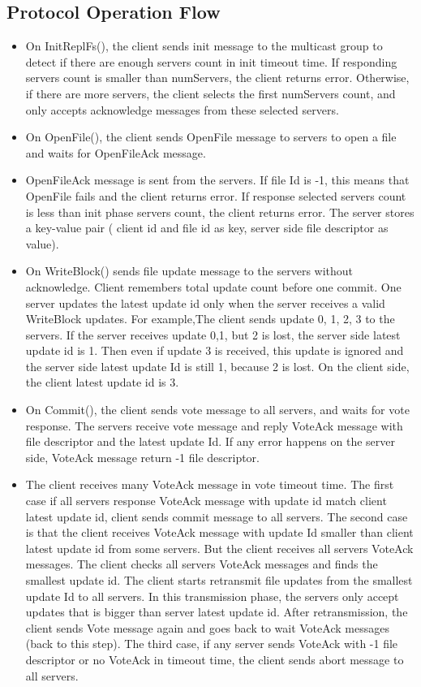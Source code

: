 \documentclass[12pt,fleqn]{article}
\begin{document}
\subsection{Protocol Operation Flow}
\begin{itemize}
	\item On InitReplFs(), the client sends init message to the multicast group to detect if there are enough servers count in init timeout time. If responding servers count is smaller than numServers, the client returns error. Otherwise, if there are more servers, the client selects the first numServers count, and only accepts acknowledge messages from these selected servers.
	\item On OpenFile(), the client sends OpenFile message to servers to open a file and waits for OpenFileAck message.
	\item OpenFileAck message is sent from the servers. If file Id is -1, this means that OpenFile fails and the client returns error. If response selected servers count is less than init phase servers count, the client returns error. The server stores a key-value pair ( client id and file id as key, server side file descriptor as value).
	\item On WriteBlock() sends file update message to the servers without acknowledge. Client remembers total update count before one commit. One server updates the latest update id only when the server receives a valid WriteBlock updates. For example,The client sends update 0, 1, 2, 3 to the servers. If the server receives update 0,1, but 2 is lost, the server side latest update id is 1. Then even if update 3 is received, this update is ignored and the server side latest update Id is still 1, because 2 is lost. On the client side, the client latest update id is 3.
	\item On Commit(), the client sends vote message to all servers, and waits for vote response. The servers receive vote message and reply VoteAck message with file descriptor and the latest update Id. If any error happens on the server side, VoteAck message return -1 file descriptor.
	\item The client receives many VoteAck message in vote timeout time. The first case if all servers response VoteAck message with update id match client latest update id, client sends commit message to all servers. The second case is that the client receives VoteAck message with update Id smaller than client latest update id from some servers. But the client receives all servers VoteAck messages. The client checks all servers VoteAck messages and finds the smallest update id. The client starts retransmit file updates from the smallest update Id to all servers. In this transmission phase, the servers only accept updates that is bigger than server latest update id. After retransmission, the client sends Vote message again and goes back to wait VoteAck messages (back to this step). The third case, if any server sends VoteAck with -1 file descriptor or no VoteAck in timeout time, the client sends abort message to all servers.

\end{itemize}
\end{document}
